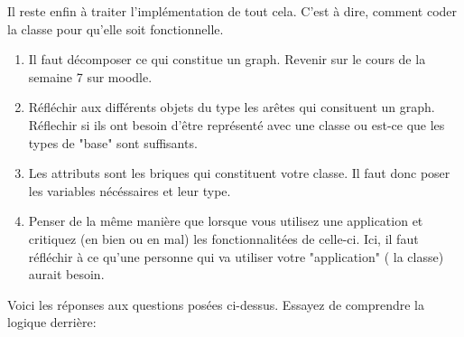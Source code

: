     Il reste enfin à traiter l'implémentation de tout cela. C'est à dire, comment coder la classe pour qu'elle soit fonctionnelle.
\begin{conseil}
   \begin{enumerate}
   \item Il faut décomposer ce qui constitue un graph. Revenir sur le cours de la semaine 7 sur moodle.
   \item Réfléchir aux différents objets du type les arêtes qui consituent un graph. Réflechir si ils ont besoin d'être représenté avec une classe ou est-ce que les types de "base" sont suffisants.
   \item Les attributs sont les briques qui constituent votre classe. Il faut donc poser les variables nécéssaires et leur type.
   \item Penser de la même manière que lorsque vous utilisez une application et critiquez (en bien ou en mal) les fonctionnalitées de celle-ci. Ici, il faut réfléchir à ce qu'une personne qui va utiliser votre "application" ( la classe) aurait besoin.
   \end{enumerate}
\end{conseil}
    
Voici les réponses aux questions posées ci-dessus. Essayez de comprendre la logique derrière:

